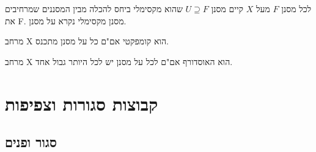 \documentclass{tstextbook}
\begin{document}
\begin{proposition}
לכל מסנן \(F\) מעל \(X\) קיים מסנן \(U\supseteq F\) שהוא מקסימלי ביחס להכלה מבין המסננים שמרחיבים את F. מסנן מקסימלי נקרא על מסנן.

\end{proposition}
\begin{proposition}
מרחב X הוא קומפקטי אם"ם כל על מסנן מתכנס.

\end{proposition}
\begin{proposition}
מרחב X הוא האוסדורף אם"ם לכל על מסנן יש לכל היותר גבול אחד.

\end{proposition}
\chapter{קבוצות סגורות וצפיפות}

\section{סגור ופנים}
\end{document}
